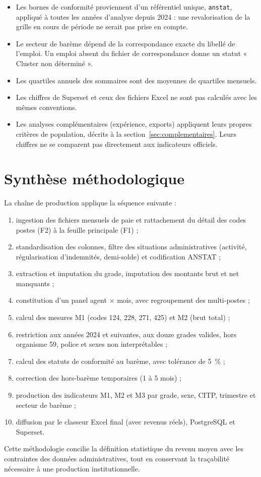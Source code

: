 \documentclass[12pt,a4paper,french]{article}
\renewcommand{\_}{\underscoreorigine\allowbreak}
\begin{document}
\begin{itemize}
    \item Les bornes de conformité proviennent d'un référentiel unique, \texttt{anstat\_2025}, appliqué à toutes les années d'analyse depuis 2024 : une revalorisation de la grille en cours de période ne serait pas prise en compte.
    \item Le secteur de barème dépend de la correspondance exacte du libellé de l'emploi. Un emploi absent du fichier de correspondance donne un statut « Cluster non déterminé ».
    \item Les quartiles annuels des sommaires sont des moyennes de quartiles mensuels.
    \item Les chiffres de Superset et ceux des fichiers Excel ne sont pas calculés avec les mêmes conventions.
    \item Les analyses complémentaires (expérience, exports) appliquent leurs propres critères de population, décrits à la section~\ref{sec:complementaires}. Leurs chiffres ne se comparent pas directement aux indicateurs officiels.
\end{itemize}

\section{Synthèse méthodologique}

La chaîne de production applique la séquence suivante :

\begin{enumerate}
    \item ingestion des fichiers mensuels de paie et rattachement du détail des codes postes (F2) à la feuille principale (F1) ;
    \item standardisation des colonnes, filtre des situations administratives (activité, régularisation d'indemnités, demi-solde) et codification ANSTAT ;
    \item extraction et imputation du grade, imputation des montants brut et net manquants ;
    \item constitution d'un panel agent $\times$ mois, avec regroupement des multi-postes ;
    \item calcul des mesures M1 (codes 124, 228, 271, 425) et M2 (brut total) ;
    \item restriction aux années 2024 et suivantes, aux douze grades valides, hors organisme 59, police et sexes non interprétables ;
    \item calcul des statuts de conformité au barème, avec tolérance de 5~\% ;
    \item correction des hors-barème temporaires (1 à 5 mois) ;
    \item production des indicateurs M1, M2 et M3 par grade, sexe, CITP, trimestre et secteur de barème ;
    \item diffusion par le classeur Excel final (avec revenus réels), PostgreSQL et Superset.
\end{enumerate}

Cette méthodologie concilie la définition statistique du revenu moyen avec les contraintes des données administratives, tout en conservant la traçabilité nécessaire à une production institutionnelle.
\end{document}

